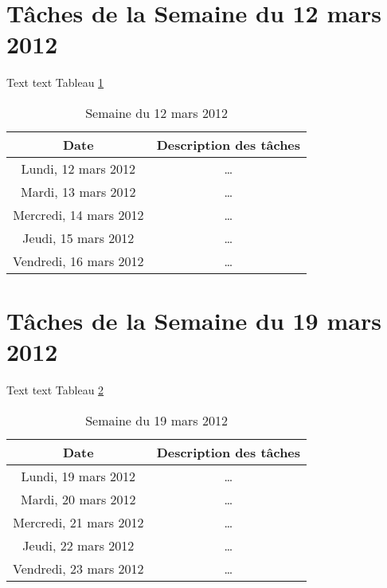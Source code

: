 \section{T\^{a}ches de la Semaine du 12 mars 2012}
Text text Tableau \ref{week3}
\begin{table}[!h]
\begin{center}
\caption{Semaine du 12 mars 2012} \label{week3}
\begin{tabular}{|c|c|}
  \hline
 \textbf{Date}  & \textbf{Description des t\^{a}ches} \\ \hline
  Lundi, 12 mars 2012 & \ldots \\ \hline
  Mardi, 13 mars 2012 & \ldots \\ \hline
  Mercredi, 14 mars 2012 & \ldots \\ \hline
  Jeudi, 15 mars 2012 & \ldots \\ \hline
  Vendredi, 16 mars 2012 & \ldots \\
  \hline
\end{tabular}
\end{center}
\end{table}
\section{T\^{a}ches de la Semaine du 19 mars 2012}
Text text Tableau \ref{week4}
\begin{table}[!h]
\begin{center}
\caption{Semaine du 19 mars 2012} \label{week4}
\begin{tabular}{|c|c|}
  \hline
 \textbf{Date}  & \textbf{Description des t\^{a}ches} \\ \hline
  Lundi, 19 mars 2012 & \ldots \\ \hline
  Mardi, 20 mars 2012 & \ldots \\ \hline
  Mercredi, 21 mars 2012 & \ldots \\ \hline
  Jeudi, 22 mars 2012 & \ldots \\ \hline
  Vendredi, 23 mars 2012 & \ldots \\
  \hline
\end{tabular}
\end{center}
\end{table}
